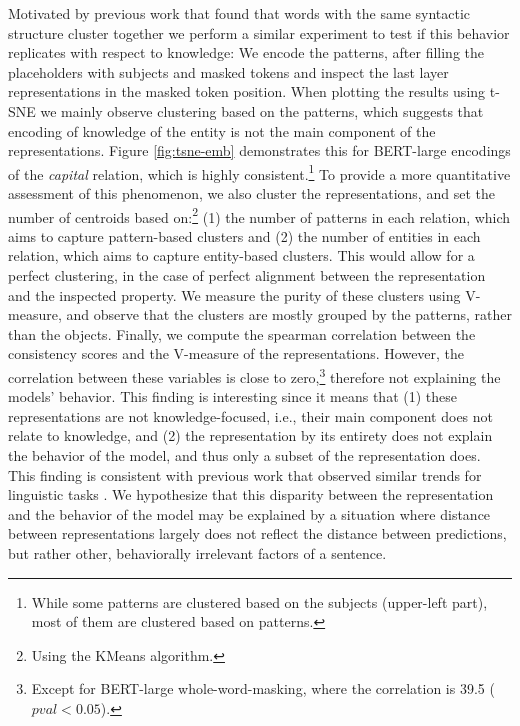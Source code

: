 Motivated by previous work that found that words with the same syntactic structure cluster together \cite{chi-etal-2020-finding,ravfogel-etal-2020-unsupervised} we perform a similar experiment to test if this behavior replicates with respect to knowledge:
We encode the patterns, after filling the placeholders with subjects and masked tokens and inspect the last layer representations in the masked token position.
When plotting the results using t-SNE \cite{tsne} we mainly
observe clustering based on the patterns, which suggests
that encoding of knowledge of the entity is not the main component of the representations.
Figure \ref{fig:tsne-emb} demonstrates
this for BERT-large encodings of the \textit{capital} relation, which is highly consistent.\footnote{While some patterns are clustered based on the subjects (upper-left part), most of them are clustered based on patterns.}
To provide a more quantitative assessment of this phenomenon, 
we also cluster the representations, and set the number of centroids based on:\footnote{Using the KMeans algorithm.} (1) the number of patterns in each relation, which aims to capture pattern-based clusters and (2) the number of entities in each relation, which aims to capture entity-based clusters. This would allow for a perfect clustering, in the case of perfect alignment between the representation and the inspected property.
We measure the purity of these clusters using V-measure, and observe that the clusters are mostly grouped by the patterns, rather than the objects.
Finally, we compute the spearman correlation between the consistency scores and the V-measure of the representations.
However, the correlation between these variables is close to zero,\footnote{Except for BERT-large whole-word-masking, where the correlation is 39.5 ($pval<0.05$).} therefore not explaining the models' behavior.
This finding is interesting since it means that (1) these representations are not knowledge-focused, i.e., their main component does not relate to knowledge, and (2) the representation by its entirety does not explain the behavior of the model, and thus only a subset of the representation does. This finding is consistent with previous work that observed similar trends for linguistic tasks \cite{amnesic_probing}.
We hypothesize that this disparity between the
representation and the behavior of the model may be
explained by a situation where distance between
representations largely does not reflect the distance
between predictions, but rather other, behaviorally irrelevant factors of a sentence.


